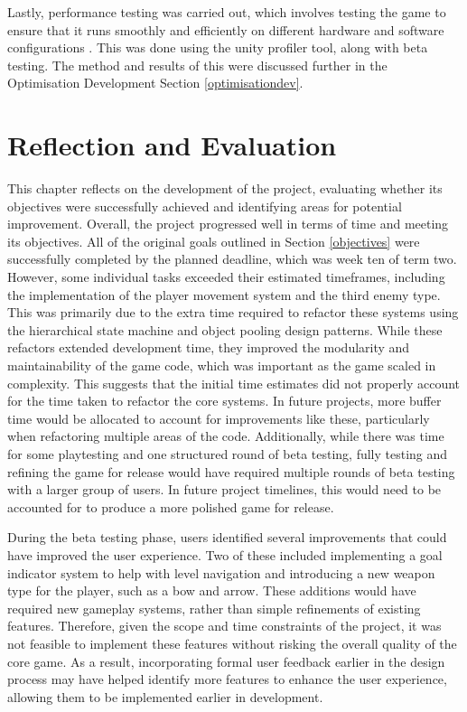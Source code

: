 \documentclass[10pt]{final_report}
\begin{document}
Lastly, performance testing was carried out, which involves testing the game to ensure that it runs smoothly and efficiently on different hardware and software configurations \cite{UnityTesting}. This was done using the unity profiler tool, along with beta testing. The method and results of this were discussed further in the Optimisation Development Section \ref{optimisationdev}.  

\chapter{Reflection and Evaluation}\label{reflection}

This chapter reflects on the development of the project, evaluating whether its objectives were successfully achieved and identifying areas for potential improvement. 
\newline
Overall, the project progressed well in terms of time and meeting its objectives. All of the original goals outlined in Section \ref{objectives} were successfully completed by the planned deadline, which was week ten of term two. However, some individual tasks exceeded their estimated timeframes, including the implementation of the player movement system and the third enemy type. This was primarily due to the extra time required to refactor these systems using the hierarchical state machine and object pooling design patterns.
While these refactors extended development time, they improved the modularity and maintainability of the game code, which was important as the game scaled in complexity. This suggests that the initial time estimates did not properly account for the time taken to refactor the core systems. In future projects, more buffer time would be allocated to account for improvements like these, particularly when refactoring multiple areas of the code.
\newline
Additionally, while there was time for some playtesting and one structured round of beta testing, fully testing and refining the game for release would have required multiple rounds of beta testing with a larger group of users. In future project timelines, this would need to be accounted for to produce a more polished game for release. \newline

During the beta testing phase, users identified several improvements that could have improved the user experience. Two of these included implementing a goal indicator system to help with level navigation and introducing a new weapon type for the player, such as a bow and arrow. These additions would have required new gameplay systems, rather than simple refinements of existing features. Therefore, given the scope and time constraints of the project, it was not feasible to implement these features without risking the overall quality of the core game.
As a result, incorporating formal user feedback earlier in the design process may have helped identify more features to enhance the user experience, allowing them to be implemented earlier in development. \newline
\end{document}
